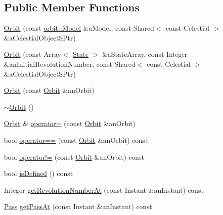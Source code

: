 \subsection*{Public Member Functions}
\begin{DoxyCompactItemize}
\item 
\hyperlink{classostk_1_1astro_1_1trajectory_1_1_orbit_aaccbf7c99f454ba6acd8aff68a2137bf}{Orbit} (const \hyperlink{classostk_1_1astro_1_1trajectory_1_1orbit_1_1_model}{orbit\+::\+Model} \&a\+Model, const Shared$<$ const Celestial $>$ \&a\+Celestial\+Object\+S\+Ptr)
\item 
\hyperlink{classostk_1_1astro_1_1trajectory_1_1_orbit_ac5396ec3866ad7afe7384bbfc4d41339}{Orbit} (const Array$<$ \hyperlink{classostk_1_1astro_1_1trajectory_1_1_state}{State} $>$ \&a\+State\+Array, const Integer \&an\+Initial\+Revolution\+Number, const Shared$<$ const Celestial $>$ \&a\+Celestial\+Object\+S\+Ptr)
\item 
\hyperlink{classostk_1_1astro_1_1trajectory_1_1_orbit_ac44603858b8379e0f2ded4236855c162}{Orbit} (const \hyperlink{classostk_1_1astro_1_1trajectory_1_1_orbit}{Orbit} \&an\+Orbit)
\item 
\hyperlink{classostk_1_1astro_1_1trajectory_1_1_orbit_aad56a0293156188474bcf1b78e55e249}{$\sim$\+Orbit} ()
\item 
\hyperlink{classostk_1_1astro_1_1trajectory_1_1_orbit}{Orbit} \& \hyperlink{classostk_1_1astro_1_1trajectory_1_1_orbit_a069e013323a8fa6c513ef07e1a26db73}{operator=} (const \hyperlink{classostk_1_1astro_1_1trajectory_1_1_orbit}{Orbit} \&an\+Orbit)
\item 
bool \hyperlink{classostk_1_1astro_1_1trajectory_1_1_orbit_aa3fdab43c081059d268984dca953cb7d}{operator==} (const \hyperlink{classostk_1_1astro_1_1trajectory_1_1_orbit}{Orbit} \&an\+Orbit) const
\item 
bool \hyperlink{classostk_1_1astro_1_1trajectory_1_1_orbit_a9c376b2163bc4fcca62abccaf03014d2}{operator!=} (const \hyperlink{classostk_1_1astro_1_1trajectory_1_1_orbit}{Orbit} \&an\+Orbit) const
\item 
bool \hyperlink{classostk_1_1astro_1_1trajectory_1_1_orbit_abb1c3d611881104558aa93c9eb948455}{is\+Defined} () const
\item 
Integer \hyperlink{classostk_1_1astro_1_1trajectory_1_1_orbit_aa8ca190bd7b20f4654e0338660f57907}{get\+Revolution\+Number\+At} (const Instant \&an\+Instant) const
\item 
\hyperlink{classostk_1_1astro_1_1trajectory_1_1orbit_1_1_pass}{Pass} \hyperlink{classostk_1_1astro_1_1trajectory_1_1_orbit_a6cf47ea28cb2fb72a2659284a997b3b5}{get\+Pass\+At} (const Instant \&an\+Instant) const

\end{DoxyCompactItemize}
